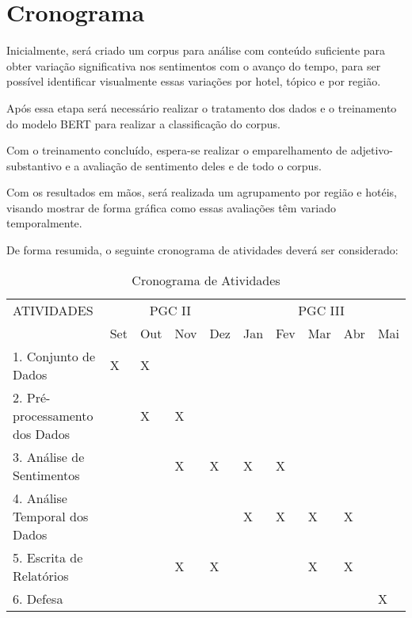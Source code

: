\chapter{Cronograma}
\label{cap:Cronograma}

Inicialmente, será criado um corpus para análise com conteúdo suficiente para obter variação significativa nos sentimentos com o avanço do tempo, para ser possível identificar visualmente essas variações por hotel, tópico e por região.

Após essa etapa será necessário realizar o tratamento dos dados e o treinamento do modelo BERT para realizar a classificação do corpus.

Com o treinamento concluído, espera-se realizar o emparelhamento de adjetivo-substantivo e a avaliação de sentimento deles e de todo o corpus.

Com os resultados em mãos, será realizada um agrupamento por região e hotéis, visando mostrar de forma gráfica como essas avaliações têm variado temporalmente.

De forma resumida, o seguinte cronograma de atividades deverá ser considerado:

\begin{table}[H]
\centering
{\footnotesize
\doublespacing
\begin{tabular}{|p{6.1cm}|l|l|l|l|l|l|l|l|l|}
\hline
\multirow{}{}{ATIVIDADES}
& \multicolumn{4}{c|}{PGC II} & \multicolumn{5}{c|}{PGC III} \\ \cline{2-10}
& Set  & Out  & Nov  & Dez & Jan & Fev & Mar & Abr & Mai \\ \hline
1. Conjunto de Dados                   & X  & X &  &  &   &   &   &  &       \\ \hline
2. Pré-processamento dos Dados                         &   & X  & X  &   &  &  &  &    &         \\ \hline
3. Análise de Sentimentos               
 &  &   & X & X & X & X &  &  &  \\ 
 \hline
4. Análise Temporal dos Dados                                   &     &     &     &     & X   & X   & X    &  X  &       \\ \hline
5. Escrita de Relatórios                                    &     &     &  X  &  X  &    &    & X   & X   &      \\ \hline
6. Defesa                                    &     &     &    &    &    &    &    &    & X     \\ \hline

\end{tabular}}
\caption{Cronograma de Atividades}
\label{tab:cronograma}
\end{table}

